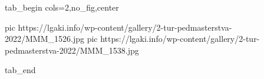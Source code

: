  
 
 
 
 


\ifcmt
  tab_begin cols=2,no_fig,center

     pic https://lgaki.info/wp-content/gallery/2-tur-pedmasterstva-2022/MMM_1526.jpg
		 pic https://lgaki.info/wp-content/gallery/2-tur-pedmasterstva-2022/MMM_1538.jpg

  tab_end
\fi
